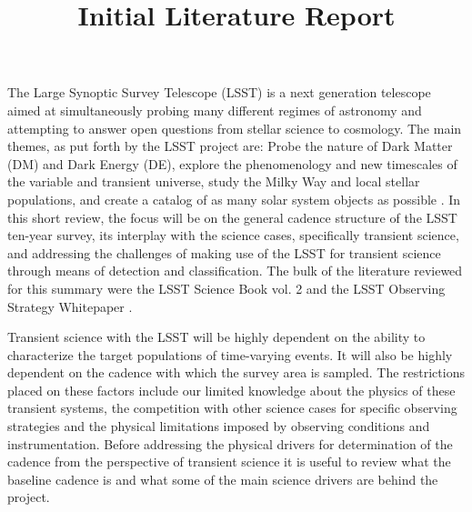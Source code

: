 \documentclass[12pt]{article}
\title{Initial Literature Report}
\begin{document}
\par

\vspace{7pt}
The Large Synoptic Survey Telescope (LSST) is a next generation telescope aimed at simultaneously probing many different regimes of astronomy and attempting to answer open questions from stellar science to cosmology. The main themes, as put forth by the LSST project are: Probe the nature of Dark Matter (DM) and Dark Energy (DE), explore the phenomenology and new timescales of the variable and transient universe, study the Milky Way and local stellar populations, and create a catalog of as many solar system objects as possible \cite{LSSTScienceCollaboration2017}. In this short review, the focus will be on the general cadence structure of the LSST ten-year survey, its interplay with the science cases, specifically transient science, and addressing the challenges of making use of the LSST for transient science through means of detection and classification. The bulk of the literature reviewed for this summary were the LSST Science Book vol. 2 and the LSST Observing Strategy Whitepaper \citep{LSSTScienceCollaboration2009,LSSTScienceCollaboration2017}. \par
Transient science with the LSST will be highly dependent on the ability to characterize the target populations of time-varying events. It will also be highly dependent on the cadence with which the survey area is sampled. The restrictions placed on these factors include our limited knowledge about the physics of these transient systems, the competition with other science cases for specific observing strategies and the physical limitations imposed by observing conditions and instrumentation. Before addressing the physical drivers for determination of the cadence from the perspective of transient science it is useful to review what the baseline cadence is and what some of the main science drivers are behind the project. \par
\end{document}
